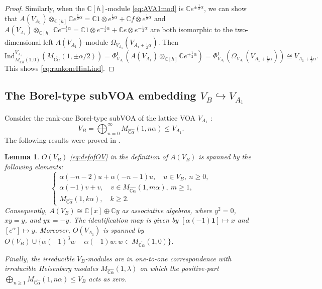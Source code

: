 \documentclass[12pt,a4paper,reqno]{amsart}
\numberwithin{equation}{section}
\numberwithin{equation}{section}
\newtheorem{lm}[thm]{Lemma}
\theoremstyle{definition}
\def \C {\mathbb{C}}
\def\la{\lambda}
\def \al{\alpha}
\def\hr{\hookrightarrow}
\def \op {\oplus}
\def \vac {\mathbf{1}}
\def\L{\mathcal{L}}
\def\o{\otimes}
\def\Om{\Omega}
\def\L{\mathsf{L}}
\def\L{\mathsf{L}}
\begin{document}
\begin{proof}
		Similarly, when the $\C[h]$-module \eqref{eq:AVA1mod} is $\C e^{\pm \frac{1}{2}\al}$, we can show that $A(V_{A_1})\o_{\C[h]}\C e^{\frac{1}{2}\al}=\C 1\o e^{\frac{1}{2}\al}+\C f\o e^{\frac{1}{2}\al}$ and $A(V_{A_1})\o_{\C[h]}\C e^{-\frac{1}{2}\al}=\C 1\o e^{-\frac{1}{2}\al}+\C e\o e^{-\frac{1}{2}\al}$ are both isomorphic to the two-dimensional left $A(V_{A_1})$-module $\Om_{V_{A_1}}(V_{A_1+\frac{1}{2}\al})$. Then 
		$$\mathrm{Ind}_{M_{\widehat{\C\al}}(1,0)}^{V_{A_1}} (M_{\widehat{\C\al}}(1,\pm \al/2))=\Phi_{V_{A_1}}^\L(A(V_{A_1})\o_{\C[h]}\C e^{\pm \frac{1}{2}\al})=\Phi_{V_{A_1}}^\L(\Om_{V_{A_1}}(V_{A_1+\frac{1}{2}\al}))\cong V_{A_1+\frac{1}{2}\al}.$$
		This shows \eqref{eq:rankoneHinLind}. 
	\end{proof}
	
	\subsection{The Borel-type subVOA embedding $V_B\hr V_{A_1}$}  Consider the rank-one Borel-type subVOA of the lattice VOA $V_{A_1}$ \cite{Liu24}:
	$$V_B=\bigoplus_{n=0}^\infty M_{\widehat{\C\al}}(1,n\al)\leq V_{A_1}.$$ 
	The following results were proved in \cite[Section 6]{Liu24}.
	
	\begin{lm}\label{lm:VB}
		$O(V_B)$ \eqref{eq:defofOV} in the definition of $A(V_B)$ is spanned by the following elements:
		\begin{equation}\label{eq:spanovb}
			\begin{cases}
				\al(-n-2)u+\al(-n-1)u,\quad  u\in V_B,\ n\geq 0,\\ 
				\al(-1)v+v,\quad v\in M_{\widehat{\C\al}}(1,m\al),\ m\geq 1,\\
				M_{\widehat{\C\al}}(1,k\al),\quad k\geq 2.
			\end{cases}
		\end{equation}
		Consequently, $A(V_B)\cong \C[x]\op \C y$ as associative algebras, where $y^2=0$, $xy=y$, and $yx=-y$. The identification map is given by $[\al(-1)\vac]\mapsto x$ and $[e^\al]\mapsto y$. Moreover, $O(V_{A_1})$ is spanned by $O(V_B)\cup \{\al(-1)^3w-\al(-1)w: w\in  M_{\widehat{\C\al}}(1,0)\}$.
		
		Finally, the irreducible $V_B$-modules are in one-to-one correspondence with irreducible Heisenberg modules $M_{\widehat{\C\al}}(1,\la)$ on which the positive-part $\bigoplus_{n\geq 1}M_{\widehat{\C\al}}(1,n\al)\leq V_B$ acts as zero.
	\end{lm}
	
\end{document}
